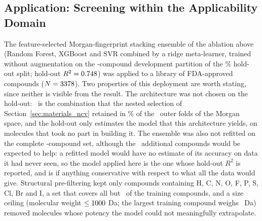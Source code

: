 \subsection{Application: Screening within the Applicability Domain}
\label{sec:materials_screening}

The feature-selected Morgan-fingerprint stacking ensemble of the ablation above (Random Forest, XGBoost and SVR
combined by a ridge meta-learner, trained without augmentation on the \ExpNDev-compound development partition of the
\HoldoutPct\% hold-out split; hold-out $R^2 = 0.748$) was applied to a library of FDA-approved compounds
($N = 3378$). Two properties of this deployment are worth stating, since neither is visible from the result.
The architecture was not chosen on the hold-out: \MorganBestArchitecture\ is the combination that the nested selection
of Section~\ref{sec:materials_ncv} retained in \MorganStability\% of the \TotalOuterFolds\ outer folds of the Morgan
space, and the hold-out only estimates the model that this architecture yields, on molecules that took no part in
building it. The ensemble was also not refitted on the complete \NCompounds-compound set, although the \ExpNTest\
additional compounds would be expected to help: a refitted model would have no estimate of its accuracy on data it had
never seen, so the model applied here is the one whose hold-out $R^2$ is reported, and is if anything conservative with
respect to what all the data would give. Structural pre-filtering kept only compounds containing H, C, N, O, F, P, S, Cl, Br and I, a
set that covers all but \ScreenTrainNOutsideElements\ of the training compounds, and a size ceiling (molecular weight
$\le 1000$ Da; the largest training compound weighs \ScreenTrainMaxMW\ Da) removed molecules whose potency the
model could not meaningfully extrapolate.


